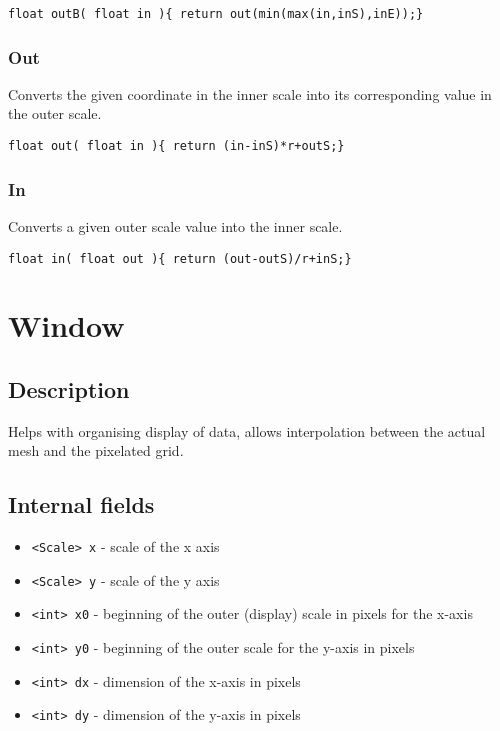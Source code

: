 \documentclass[notitlepage]{article}
\begin{document}
\begin{lstlisting}[style=myCpp]
float outB( float in ){ return out(min(max(in,inS),inE));}
\end{lstlisting}

\subsubsection{Out}

Converts the given coordinate in the inner scale into its corresponding value
in the outer scale.

\begin{lstlisting}[style=myCpp]
float out( float in ){ return (in-inS)*r+outS;} 
\end{lstlisting}

\subsubsection{In}

Converts a given outer scale value into the inner scale.

\begin{lstlisting}[style=myCpp]
float in( float out ){ return (out-outS)/r+inS;}
\end{lstlisting}

\section{Window}

\subsection{Description}

Helps with organising display of data, allows interpolation between the actual mesh
and the pixelated grid.

\subsection{Internal fields}

\begin{itemize}
\item \texttt{<Scale> x} - scale of the x axis
\item \texttt{<Scale> y} - scale of the y axis
\item \texttt{<int> x0} - beginning of the outer (display) scale in pixels for the x-axis
\item \texttt{<int> y0} - beginning of the outer scale for the y-axis in pixels
\item \texttt{<int> dx} - dimension of the x-axis in pixels
\item \texttt{<int> dy} - dimension of the y-axis in pixels
\end{itemize}
\end{document}
